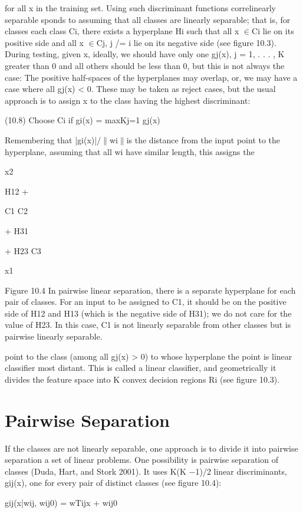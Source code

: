 for all x in the training set. Using such discriminant functions correlinearly separable sponds to assuming that all classes are linearly separable; that is, for classes each class Ci, there exists a hyperplane Hi such that all x $\in$Ci lie on its positive side and all x $\in$Cj, j /= i lie on its negative side (see figure 10.3). During testing, given x, ideally, we should have only one gj(x), j = 1, . . . , K greater than 0 and all others should be less than 0, but this is not always the case: The positive half-spaces of the hyperplanes may overlap, or, we may have a case where all gj(x) < 0. These may be taken as reject cases, but the usual approach is to assign x to the class having the highest discriminant:

(10.8) Choose Ci if gi(x) = maxKj=1 gj(x)

Remembering that |gi(x)|/$\parallel$wi$\parallel$is the distance from the input point to the hyperplane, assuming that all wi have similar length, this assigns the

x2

H12 +

C1 C2

+ H31

+ H23 C3

x1

Figure 10.4 In pairwise linear separation, there is a separate hyperplane for each pair of classes. For an input to be assigned to C1, it should be on the positive side of H12 and H13 (which is the negative side of H31); we do not care for the value of H23. In this case, C1 is not linearly separable from other classes but is pairwise linearly separable.

point to the class (among all gj(x) > 0) to whose hyperplane the point is linear classifier most distant. This is called a linear classifier, and geometrically it divides the feature space into K convex decision regions Ri (see figure 10.3).

\section{Pairwise Separation}

If the classes are not linearly separable, one approach is to divide it into pairwise separation a set of linear problems. One possibility is pairwise separation of classes (Duda, Hart, and Stork 2001). It uses K(K $-$1)/2 linear discriminants, gij(x), one for every pair of distinct classes (see figure 10.4):

gij(x|wij, wij0) = wTijx + wij0

